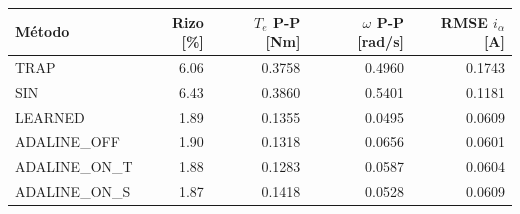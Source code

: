\begin{tabular}{lrrrr}
\toprule
M\'etodo & Rizo [\%] & $T_e$ P-P [Nm] & $\omega$ P-P [rad/s] & RMSE $i_\alpha$ [A] \\
\midrule
TRAP & 6.06 & 0.3758 & 0.4960 & 0.1743 \\
SIN & 6.43 & 0.3860 & 0.5401 & 0.1181 \\
LEARNED & 1.89 & 0.1355 & 0.0495 & 0.0609 \\
ADALINE\_OFF & 1.90 & 0.1318 & 0.0656 & 0.0601 \\
ADALINE\_ON\_T & 1.88 & 0.1283 & 0.0587 & 0.0604 \\
ADALINE\_ON\_S & 1.87 & 0.1418 & 0.0528 & 0.0609 \\
\bottomrule
\end{tabular}
